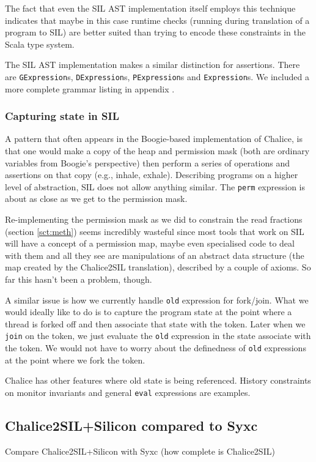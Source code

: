 The fact that even the SIL AST implementation itself employs this technique indicates that maybe in this case runtime checks (running during translation of a program to SIL) are better suited than trying to encode these constraints in the Scala type system.

The SIL AST implementation makes a similar distinction for assertions. 
There are \texttt{GExpression}s, \lstinline!DExpression!s, \lstinline!PExpression!s and \lstinline!Expression!s. 
We included a more complete grammar listing in appendix  \label{apdx:grammar}.

\subsubsection{Capturing state in SIL}
A pattern that often appears in the Boogie-based implementation of Chalice, is that one would make a copy of the heap and permission mask (both are ordinary variables from Boogie's perspective) then perform a series of operations and assertions on that copy (e.g., inhale, exhale).
Describing programs on a higher level of abstraction, SIL does not allow anything similar.
The \lstinline[language=Chalice]!perm! expression is about as close as we get to the permission mask.

Re-implementing the permission mask as we did to constrain the read fractions (section \ref{sct:meth}) seems incredibly wasteful since most tools that  work on SIL will have a concept of a permission map, maybe even specialised code to deal with them and all they see are manipulations of an abstract data structure (the map created by the Chalice2SIL translation), described by a couple of axioms.
So far this hasn't been a problem, though.

A similar issue is how we currently handle \lstinline[language=Chalice]!old! expression for fork/join.
What we would ideally like to do is to capture the program state at the point where a thread is forked off and then associate that state with the token.
Later when we \lstinline[language=Chalice]!join! on the token, we just evaluate the \lstinline[language=Chalice]!old! expression in the state associate with the token. 
We would not have to worry about the definedness of \lstinline[language=Chalice]!old! expressions at the point where we fork the token.

Chalice has other features where old state is being referenced. 
History constraints on monitor invariants and general \lstinline[language=Chalice]!eval! expressions are examples.

\subsection{Chalice2SIL+Silicon compared to Syxc}
\begin{sketch}
Compare Chalice2SIL+Silicon with Syxc (how complete is Chalice2SIL)
\end{sketch}


